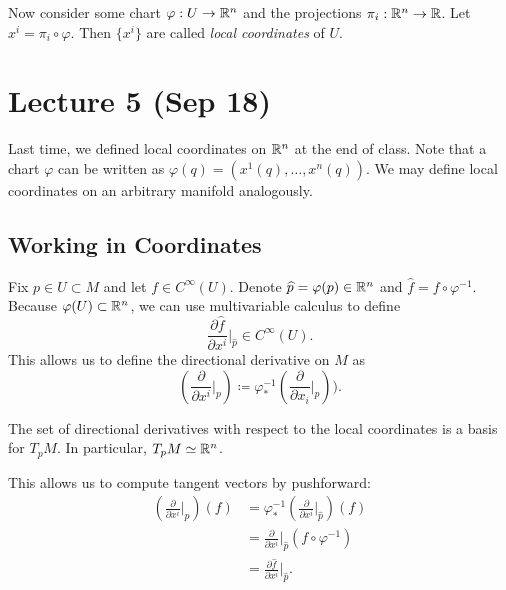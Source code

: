 \documentclass[twoside, 10pt]{article}
\begin{document}
    \begin{defn} Now consider some chart $\varphi:U \to \mathbb{R}^n$ and the
    projections $\pi_i:\mathbb{R}^n \to \mathbb{R}$. Let $x^i = \pi_i \circ \varphi$. Then
$\{x^i\}$ are called \textit{local coordinates} of $U$.  \end{defn}

    \section{Lecture 5 (Sep 18)}%
    
    Last time, we defined local coordinates on $\mathbb{R}^n$ at the end of class. Note
    that a chart $\varphi$ can be written as $\varphi(q) = (x^1(q), \ldots,
    x^n(q))$. We may define local coordinates on an arbitrary manifold
    analogously.

    \subsection{Working in Coordinates}%
    
    Fix $p \in U \subset M$ and let $f \in C^{\infty}(U)$. Denote $\widehat{p}
    = \varphi(p) \in \mathbb{R}^n$ and $\widehat{f} = f \circ \varphi^{-1}$. Because
    $\varphi(U) \subset \mathbb{R}^n$, we can use multivariable calculus to define
    \[\frac{\partial \widehat{f}}{\partial x^i}\Bigg\vert_{\widehat{p}} \in
    C^{\infty}(U).\] This allows us to define the directional derivative on $M$
    as \[\left(\frac{\partial}{\partial x^i}\bigg\vert_p \right) \coloneqq
    \varphi^{-1}_* \left( \frac{\partial}{\partial x_i}\bigg\vert_{\widehat{p}}
\right)).\]

    \begin{prop} The set of directional derivatives with respect to the local
    coordinates is a basis for $T_pM$. In particular, $T_pM \simeq \mathbb{R}^n$.
\end{prop}

    This allows us to compute tangent vectors by pushforward: \begin{align*}
        \left( \frac{\partial}{\partial x^i} \bigg\vert_p \right)(f) &=
        \varphi^{-1}_* \left( \frac{\partial}{\partial x^i}
    \bigg\vert_{\widehat{p}} \right)(f) \\ &= \frac{\partial}{\partial x^i}
    \bigg\vert_{\widehat{p}} (f \circ \varphi^{-1}) \\ &= \frac{\partial
\widehat{f}}{\partial x^i} \bigg\vert_{\widehat{p}}.  \end{align*}
\end{document}
